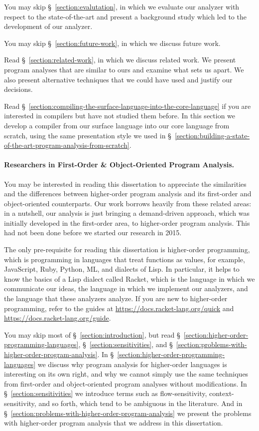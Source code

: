 \documentclass[12pt, oneside]{book}
\begin{document}
You may skip §~\ref{section:evalutation}, in which we evaluate our analyzer with respect to the state-of-the-art and present a background study which led to the development of our analyzer.

You may skip §~\ref{section:future-work}, in which we discuss future work.

Read §~\ref{section:related-work}, in which we discuss related work. We present program analyses that are similar to ours and examine what sets us apart. We also present alternative techniques that we could have used and justify our decisions.

Read §~\ref{section:compiling-the-surface-language-into-the-core-language} if you are interested in compilers but have not studied them before. In this section we develop a compiler from our surface language into our core language from scratch, using the same presentation style we used in §~\ref{section:building-a-state-of-the-art-program-analysis-from-scratch}.

\paragraph{Researchers in First-Order \& Object-Oriented Program Analysis.}

You may be interested in reading this dissertation to appreciate the similarities and the differences between higher-order program analysis and its first-order and object-oriented counterparts. Our work borrows heavily from these related areas: in a nutshell, our analysis is just bringing a demand-driven approach, which was initially developed in the first-order area, to higher-order program analysis. This had not been done before we started our research in 2015.

The only pre-requisite for reading this dissertation is higher-order programming, which is programming in languages that treat functions as values, for example, JavaScript, Ruby, Python, ML, and dialects of Lisp. In particular, it helps to know the basics of a Lisp dialect called Racket, which is the language in which we communicate our ideas, the language in which we implement our analyzers, and the language that these analyzers analyze. If you are new to higher-order programming, refer to the guides at \url{https://docs.racket-lang.org/quick} and \url{https://docs.racket-lang.org/guide}.

You may skip most of §~\ref{section:introduction}, but read §~\ref{section:higher-order-programming-languages}, §~\ref{section:sensitivities}, and §~\ref{section:problems-with-higher-order-program-analysis}. In §~\ref{section:higher-order-programming-languages} we discuss why program analysis for higher-order languages is interesting on its own right, and why we cannot simply use the same techniques from first-order and object-oriented program analyses without modifications. In §~\ref{section:sensitivities} we introduce terms such as flow-sensitivity, context-sensitivity, and so forth, which tend to be ambiguous in the literature. And in §~\ref{section:problems-with-higher-order-program-analysis} we present the problems with higher-order program analysis that we address in this dissertation.
\end{document}

